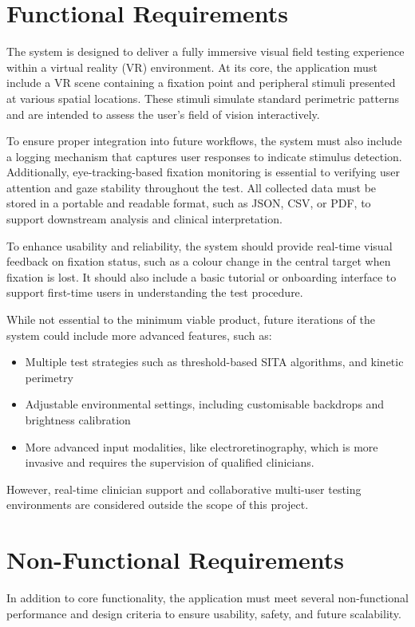 \documentclass{l4proj}
\begin{document}
\section{Functional Requirements}

The system is designed to deliver a fully immersive visual field testing experience within a virtual reality (VR) environment. At its core, the application must include a VR scene containing a fixation point and peripheral stimuli presented at various spatial locations. These stimuli simulate standard perimetric patterns and are intended to assess the user’s field of vision interactively.

To ensure proper integration into future workflows, the system must also include a logging mechanism that captures user responses to indicate stimulus detection. Additionally, eye-tracking-based fixation monitoring is essential to verifying user attention and gaze stability throughout the test. All collected data must be stored in a portable and readable format, such as JSON, CSV, or PDF, to support downstream analysis and clinical interpretation.

To enhance usability and reliability, the system should provide real-time visual feedback on fixation status, such as a colour change in the central target when fixation is lost. It should also include a basic tutorial or onboarding interface to support first-time users in understanding the test procedure.

While not essential to the minimum viable product, future iterations of the system could include more advanced features, such as:

\begin{itemize}
    \item Multiple test strategies such as threshold-based SITA algorithms, and kinetic perimetry

    \item Adjustable environmental settings, including customisable backdrops and brightness calibration

    \item More advanced input modalities, like electroretinography, which is more invasive and requires the supervision of qualified clinicians. 
\end{itemize}

However, real-time clinician support and collaborative multi-user testing environments are considered outside the scope of this project.


\section{Non-Functional Requirements}
In addition to core functionality, the application must meet several non-functional performance and design criteria to ensure usability, safety, and future scalability.
\end{document}
